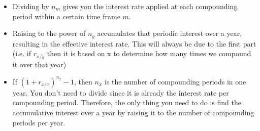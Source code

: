 \begin{intuition}
    \begin{itemize}
        \item Dividing by $n_m$ gives you the interest rate applied at each compounding period within a certain time frame $m$.
        \item Raising to the power of $n_y$ accumulates that periodic interest over a year, resulting in the effective interest rate. This will always be due to the first part (i.e. if $r_{x/y}$ then it is based on x to determine how many times we compound it over that year)
        \item If $\left(1 + r_{x/x}\right)^{n_x} -1$, then $n_x$ is the number of compounding periods in one year. You don't need to divide since it is already the interest rate per compounding period. Therefore, the only thing you need to do is find the accumulative interest over a year by raising it to the number of compounding periods per year.
    \end{itemize}
\end{intuition}
